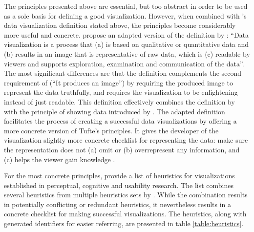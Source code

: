 The principles presented above are essential, but too abstract in order to be used as a sole basis for defining a good visualization. However, when combined with \citeauthor{kosara_visualization_2007}'s data visualization definition stated above, the principles become considerably more useful and concrete. \citet{azzam_j-b_2013} propose an adapted version of the definition by \citet{kosara_visualization_2007}: ``Data visualization is a process that (a) is based on qualitative or quantitative data and (b) results in an image that is representative of raw data, which is (c) readable by viewers and supports exploration, examination and communication of the data''. The most significant differences are that the definition complements the second requirement of \citeauthor{kosara_visualization_2007} (``It produces an image'') by requiring the produced image to represent the data truthfully, and requires the visualization to be enlightening instead of just readable. This definition effectively combines the definition by \citet{kosara_visualization_2007} with the principle of showing data introduced by \citet{tufte_visual_1986}. The adapted definition facilitates the process of creating a successful data visualizations by offering a more concrete version of Tufte's principles. It gives the developer of the visualization slightly more concrete checklist for representing the data: make sure the representation does not (a) omit or (b) overrepresent any information, and (c) helps the viewer gain knowledge \citep{azzam_j-b_2013}.

For the most concrete principles, \citet{zuk_heuristics_2006} provide a list of heuristics for visualizations established in perceptual, cognitive and usability research. The list combines several heuristics from multiple heuristics sets by \citet{shneiderman_eyes_1996,zuk_theoretical_2006,amar_knowledge_2004}. While the combination results in potentially conflicting or redundant heuristics, it nevertheless results in a concrete checklist for making successful visualizations. The heuristics, along with generated identifiers for easier referring, are presented in table \ref{table:heuristics}.

